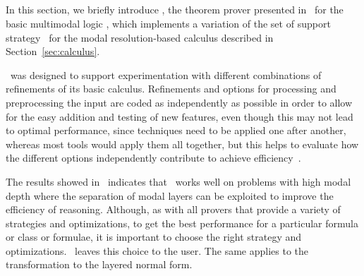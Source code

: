 

\begin{example}
    
\end{example}

\begin{example}
    
\end{example}

\subsection{\ksp}
In this section, we briefly introduce \ksp, the theorem prover presented
in~\cite{Nalon2016} for the basic multimodal logic , which
implements a variation of the set of support strategy~\cite{wos1965efficiency}
for the modal resolution-based calculus described in Section~\ref{sec:calculus}.

\ksp\ was designed to support experimentation with different combinations of
refinements of its basic calculus. Refinements and options for processing and
preprocessing the input are coded as independently as possible in order to allow
for the easy addition and testing of new features, even though this may not lead
to optimal performance, since techniques need to be applied one after another,
whereas most tools would apply them all together, but this helps to evaluate how
the different options independently contribute to achieve
efficiency~\cite{Nalon2016}. 

The results showed in~\cite{Nalon2016} indicates that \ksp\ works well on
problems with high modal depth where the separation of modal layers can be
exploited to improve the efficiency of reasoning. Although, as with all provers
that provide a variety of strategies and optimizations, to get the best
performance for a particular formula or class or formulae, it is important to
choose the right strategy and optimizations. \ksp\ leaves this choice to the
user. The same applies to the transformation to the layered normal form.
